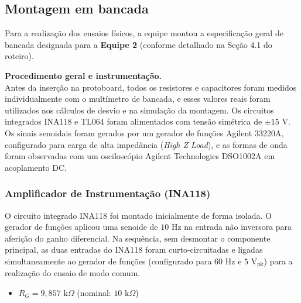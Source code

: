 \documentclass[11pt,a4paper]{article}
\begin{document}
\subsection{Montagem em bancada}


Para a realização dos ensaios físicos, a equipe montou a especificação geral de bancada designada para a \textbf{Equipe 2} (conforme detalhado na Seção 4.1 do roteiro). 

\vspace{0.3cm}

\textbf{Procedimento geral e instrumentação.} \\
Antes da inserção na protoboard, todos os resistores e capacitores foram medidos individualmente com o multímetro de bancada, e esses valores reais foram utilizados nos cálculos de desvio e na simulação da montagem. Os circuitos integrados INA118 e TL064 foram alimentados com tensão simétrica de $\pm15\text{ V}$. Os sinais senoidais foram gerados por um gerador de funções Agilent 33220A, configurado para carga de alta impedância (\textit{High Z Load}), e as formas de onda foram observadas com um osciloscópio Agilent Technologies DSO1002A em acoplamento DC.

\subsubsection{Amplificador de Instrumentação (INA118)}
O circuito integrado INA118 foi montado inicialmente de forma isolada. O gerador de funções aplicou uma senoide de $10\text{ Hz}$ na entrada não inversora para aferição do ganho diferencial. Na sequência, sem desmontar o componente principal, as duas entradas do INA118 foram curto-circuitadas e ligadas simultaneamente ao gerador de funções (configurado para $60\text{ Hz}$ e $5\text{ V}_{\text{pk}}$) para a realização do ensaio de modo comum.

\begin{itemize}
    \item $R_G = 9{,}857\text{ k}\Omega$ (nominal: $10\text{ k}\Omega$)
\end{itemize}
\end{document}
